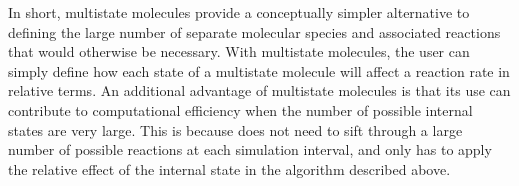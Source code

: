 




In short, multistate molecules provide a conceptually simpler
alternative to defining the large number of separate molecular species
and associated reactions that would otherwise be necessary.  With
multistate molecules, the user can simply define how each state of a
multistate molecule will affect a reaction rate in relative terms.  An
additional advantage of multistate molecules is that its use can
contribute to computational efficiency when the number of possible
internal states are very large.  This is because \stochsim{} does not
need to sift through a large number of possible reactions at each
simulation interval, and only has to apply the relative effect of the
internal state in the algorithm described above.



